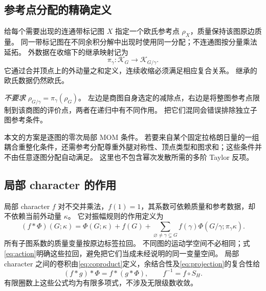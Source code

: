 \documentclass[11pt,a4paper]{ctexart}
\theoremstyle{cnplain}
\theoremstyle{remark}\newtheorem{remark}[theorem]{注}
\begin{document}
\subsection{参考点分配的精确定义}
给每个需要出现的连通带标记图 $X$ 指定一个欧氏参考点 $\rho_X$，质量保持该图原边质量。
同一带标记图在不同余积分解中出现时使用同一分配；不连通图按分量乘法延拓。
外数据在收缩下的继承映射记为
\begin{equation}\label{eq:projection}
 \pi_\gamma:\mathcal K_G\longrightarrow\mathcal K_{G/\gamma}.
\end{equation}
它通过合并顶点上的外动量之和定义，连续收缩必须满足相应复合关系。
继承的欧氏数据仍然欧氏。

\emph{不要求} $\rho_{G/\gamma}=\pi_\gamma(\rho_G)$。
左边是商图自身选定的减除点，右边是将整图参考点限制到该商图的评价点，两者在递归中有不同作用。
把它们混同会错误排除独立子图参考条件。

本文的方案是逐图的零次局部 MOM 条件。
若要来自某个固定拉格朗日量的一组耦合重整化条件，还需参考分配尊重外腿对称性、顶点类型和图求和；这些条件并不由任意逐图分配自动满足。
这里也不包含幂次发散所需的多阶 Taylor 反项。

\subsection{局部 character 的作用}
局部 character $f$ 对不交并乘法，$f(1)=1$，其系数可依赖质量和参考数据，却不依赖当前外动量 $\kappa$。
它对振幅规则的作用定义为
\begin{equation}\label{eq:action}
 (f*\Phi)(G;\kappa)=\Phi(G;\kappa)+f(G)
   +\sum_{\varnothing\ne\gamma\subsetneq G}
        f(\gamma)\Phi(G/\gamma;\pi_\gamma\kappa).
\end{equation}
所有子图系数的质量变量按原边标签拉回。
不同图的运动学空间不必相同；式\eqref{eq:action}明确这些拉回，避免把它们当成未经说明的同一变量空间。
局部 character 之间的卷积由\eqref{eq:coproduct}定义，余结合性及\eqref{eq:projection}的复合性给
\begin{equation}\label{eq:associative}
 (f*g)*\Phi=f*(g*\Phi),\qquad f^{-1}=f\circ S_H.
\end{equation}
有限圈数上这些公式均为有限多项式，不涉及无限级数收敛。
\end{document}
